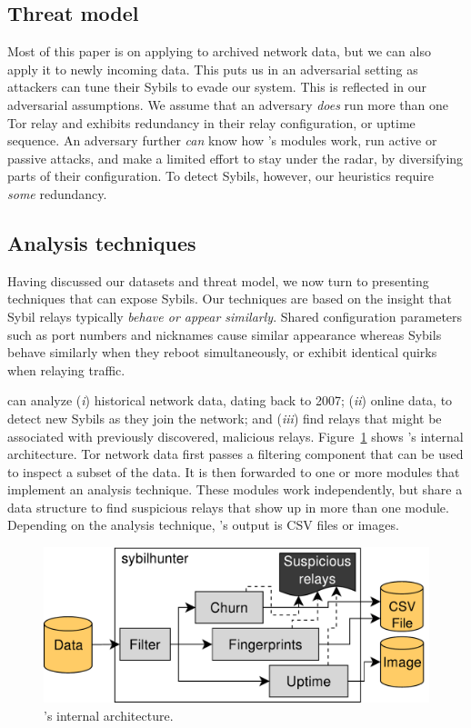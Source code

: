 \subsection{Threat model}
\label{sec:threat_model}
Most of this paper is on applying \sys to archived network data, but we can also
apply it to newly incoming data.  This puts us in an adversarial setting as
attackers can tune their Sybils to evade our system.  This is reflected in our
adversarial assumptions.  We assume that an adversary \emph{does} run more than
one Tor relay and exhibits redundancy in their relay configuration, or uptime
sequence.  An adversary further \emph{can} know how \sys's modules work, run
active or passive attacks, and make a limited effort to stay under the radar, by
diversifying parts of their configuration.  To detect Sybils, however, our
heuristics require \emph{some} redundancy.

\subsection{Analysis techniques}
\label{sec:techniques}
Having discussed our datasets and threat model, we now turn to presenting
techniques that can expose Sybils.  Our techniques are based on the insight that
Sybil relays typically \emph{behave or appear similarly}.  Shared configuration
parameters such as port numbers and nicknames cause similar appearance whereas
Sybils behave similarly when they reboot simultaneously, or exhibit identical
quirks when relaying traffic.

\Sys can analyze (\emph{i}) historical network data, dating back to 2007;
(\emph{ii}) online data, to detect new Sybils as they join the network; and
(\emph{iii}) find relays that might be associated with previously discovered,
malicious relays.  Figure~\ref{fig:shr-internal} shows \sys's internal
architecture.  Tor network data first passes a filtering component that can be
used to inspect a subset of the data.  It is then forwarded to one or more
modules that implement an analysis technique.  These modules work independently,
but share a data structure to find suspicious relays that show up in more than
one module.  Depending on the analysis technique, \sys's output is CSV
files or images.

\begin{figure}[t]
	\centering
	\includegraphics[width=0.9\linewidth]{diagrams/sybilhunter-internal.pdf}
	\caption{\Sys's internal architecture.}
	\label{fig:shr-internal}
\end{figure}

